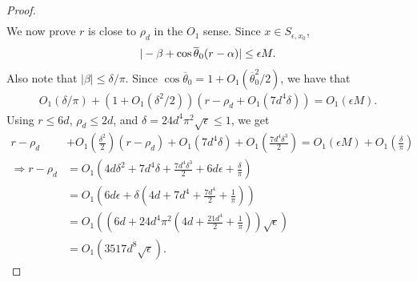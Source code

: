 \documentclass{article}
\begin{document}
\begin{proof}
\begin{align*}
\end{align*} We now prove $r$ is close to $\rho_d$ in the $O_1$ sense. Since $x \in S_{\epsilon,x_0}$, \begin{align*}
|-\beta + \cos \overline{\theta}_0(r - \alpha)|\leq \epsilon M.
\end{align*} Also note that $|\beta| \leq \delta/\pi$. Since $\cos \overline{\theta}_0 = 1 + O_1(\overline{\theta}_0^2/2)$, we have that \begin{align*}
O_1(\delta/\pi) + (1 + O_1(\delta^2/2))(r - \rho_d + O_1(7d^4\delta)) = O_1(\epsilon M).
\end{align*} Using $r \leq 6d$, $\rho_d \leq 2d$, and $\delta = 24d^4\pi^2\sqrt{\epsilon} \leq 1$, we get \begin{align*}
r - \rho_d & + O_1 \left(\frac{\delta^2}{2}\right)( r - \rho_d) + O_1(7d^4 \delta) + O_1\left(\frac{7d^4\delta^3}{2}\right) = O_1(\epsilon M) + O_1 \left(\frac{\delta}{\pi}\right)  \\
\Longrightarrow r - \rho_d & = O_1\left(4d\delta^2 + 7d^4\delta + \frac{7d^4\delta^3}{2} + 6d\epsilon + \frac{\delta}{\pi}\right) \\
& = O_1\left(6d\epsilon + \delta\left(4d + 7d^4 + \frac{7d^4}{2} + \frac{1}{\pi}\right)\right) \\
& = O_1\left(\left(6d + 24d^4\pi^2\left(4d + \frac{21d^4}{2} + \frac{1}{\pi}\right)\right)\sqrt{\epsilon}\right) \\
& = O_1(3517d^8\sqrt{\epsilon}).
\end{align*}


\end{proof}
\end{document}
